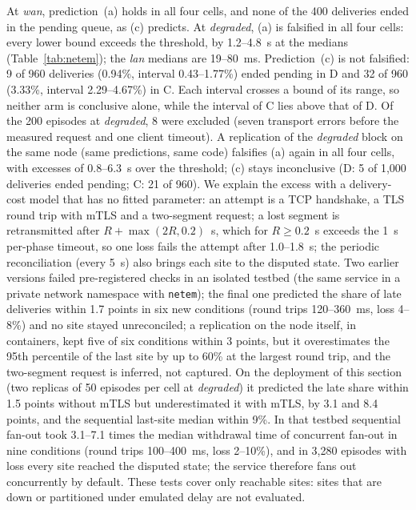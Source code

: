 \documentclass[journal]{IEEEtran}
\theoremstyle{definition}
\begin{document}
At \emph{wan}, prediction~(a) holds in all four cells, and none of the 400 deliveries ended in the pending queue, as (c) predicts. At \emph{degraded}, (a) is falsified in all four cells: every lower bound exceeds the threshold, by 1.2--4.8~s at the medians (Table~\ref{tab:netem}); the \emph{lan} medians are 19--80~ms. Prediction~(c) is not falsified: 9 of 960 deliveries (0.94\%, interval 0.43--1.77\%) ended pending in D and 32 of 960 (3.33\%, interval 2.29--4.67\%) in C. Each interval crosses a bound of its range, so neither arm is conclusive alone, while the interval of C lies above that of D. Of the 200 episodes at \emph{degraded}, 8 were excluded (seven transport errors before the measured request and one client timeout). A replication of the \emph{degraded} block on the same node (same predictions, same code) falsifies (a) again in all four cells, with excesses of 0.8--6.3~s over the threshold; (c) stays inconclusive (D: 5 of 1,000 deliveries ended pending; C: 21 of 960).
We explain the excess with a delivery-cost model that has no fitted parameter: an attempt is a TCP handshake, a TLS round trip with mTLS and a two-segment request; a lost segment is retransmitted after $R+\max(2R,0.2)$~s, which for $R\ge0.2$~s exceeds the 1~s per-phase timeout, so one loss fails the attempt after 1.0--1.8~s; the periodic reconciliation (every 5~s) also brings each site to the disputed state. Two earlier versions failed pre-registered checks in an isolated testbed (the same service in a private network namespace with \texttt{netem}); the final one predicted the share of late deliveries within 1.7 points in six new conditions (round trips 120--360~ms, loss 4--8\%) and no site stayed unreconciled; a replication on the node itself, in containers, kept five of six conditions within 3 points, but it overestimates the 95th percentile of the last site by up to 60\% at the largest round trip, and the two-segment request is inferred, not captured. On the deployment of this section (two replicas of 50 episodes per cell at \emph{degraded}) it predicted the late share within 1.5 points without mTLS but underestimated it with mTLS, by 3.1 and 8.4 points, and the sequential last-site median within 9\%. In that testbed sequential fan-out took 3.1--7.1 times the median withdrawal time of concurrent fan-out in nine conditions (round trips 100--400~ms, loss 2--10\%), and in 3,280 episodes with loss every site reached the disputed state; the service therefore fans out concurrently by default. These tests cover only reachable sites: sites that are down or partitioned under emulated delay are not evaluated.
\end{document}
